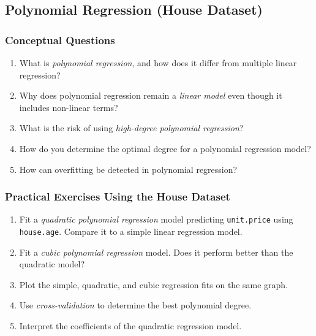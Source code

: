 \documentclass[
  11pt,
]{book}
\providecommand{\tightlist}{%
  \setlength{\itemsep}{0pt}\setlength{\parskip}{0pt}}
\theoremstyle{definition}
\theoremstyle{definition}
\theoremstyle{definition}
\theoremstyle{definition}
\theoremstyle{remark}
\begin{document}
\subsection*{Polynomial Regression (House Dataset)}\label{polynomial-regression-house-dataset}


\subsubsection*{Conceptual Questions}\label{conceptual-questions-7}


\begin{enumerate}
\def\labelenumi{\arabic{enumi}.}
\setcounter{enumi}{24}
\tightlist
\item
  What is \emph{polynomial regression}, and how does it differ from multiple linear regression?\\
\item
  Why does polynomial regression remain a \emph{linear model} even though it includes non-linear terms?\\
\item
  What is the risk of using \emph{high-degree polynomial regression}?\\
\item
  How do you determine the optimal degree for a polynomial regression model?\\
\item
  How can overfitting be detected in polynomial regression?
\end{enumerate}

\subsubsection*{Practical Exercises Using the House Dataset}\label{practical-exercises-using-the-house-dataset-1}


\begin{enumerate}
\def\labelenumi{\arabic{enumi}.}
\setcounter{enumi}{29}
\tightlist
\item
  Fit a \emph{quadratic polynomial regression} model predicting \texttt{unit.price} using \texttt{house.age}. Compare it to a simple linear regression model.\\
\item
  Fit a \emph{cubic polynomial regression} model. Does it perform better than the quadratic model?\\
\item
  Plot the simple, quadratic, and cubic regression fits on the same graph.\\
\item
  Use \emph{cross-validation} to determine the best polynomial degree.\\
\item
  Interpret the coefficients of the quadratic regression model.
\end{enumerate}
\end{document}
